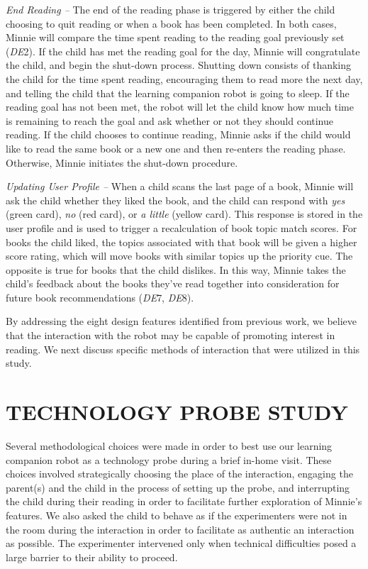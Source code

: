 \documentclass{sigchi}
\begin{document}
\textit{End Reading --} The end of the reading phase is triggered by either the child choosing to quit reading or when a book has been completed. In both cases, Minnie will compare the time spent reading to the reading goal previously set (\textit{DE}2). If the child has met the reading goal for the day, Minnie will congratulate the child, and begin the shut-down process. Shutting down consists of thanking the child for the time spent reading, encouraging them to read more the next day, and telling the child that the learning companion robot is going to sleep. If the reading goal has not been met, the robot will let the child know how much time is remaining to reach the goal and ask whether or not they should continue reading. If the child chooses to continue reading, Minnie asks if the child would like to read the same book or a new one and then re-enters the reading phase. Otherwise, Minnie initiates the shut-down procedure. 

\textit{Updating User Profile --} When a child scans the last page of a book, Minnie will ask the child whether they liked the book, and the child can respond with \textit{yes} (green card), \textit{no} (red card), or \textit{a little} (yellow card). This response is stored in the user profile and is used to trigger a recalculation of book topic match scores. For books the child liked, the topics associated with that book will be given a higher score rating, which will move books with similar topics up the priority cue. The opposite is true for books that the child dislikes. In this way, Minnie takes the child's feedback about the books they've read together into consideration for future book recommendations (\textit{DE}7, \textit{DE}8).

By addressing the eight design features identified from previous work, we believe that the interaction with the robot may be capable of promoting interest in reading. We next discuss specific methods of interaction that were utilized in this study.

\section{TECHNOLOGY PROBE STUDY}
Several methodological choices were made in order to best use our learning companion robot as a technology probe during a brief in-home visit. These choices involved strategically choosing the place of the interaction, engaging the parent(s) and the child in the process of setting up the probe, and interrupting the child during their reading in order to facilitate further exploration of Minnie's features. We also asked the child to behave as if the experimenters were not in the room during the interaction in order to facilitate as authentic an interaction as possible. The experimenter intervened only when technical difficulties posed a large barrier to their ability to proceed.
\end{document}
